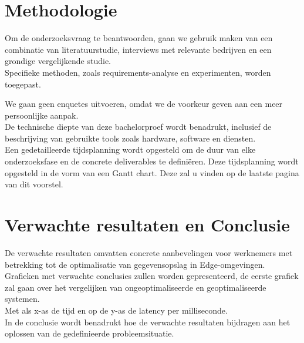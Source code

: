 \newpage


\section{Methodologie}%
\label{sec:methodologie}

Om de onderzoeksvraag te beantwoorden, gaan we gebruik maken van een combinatie van literatuurstudie,
 interviews met relevante bedrijven en een grondige vergelijkende studie. \\
 
Specifieke methoden, zoals requirements-analyse en experimenten, worden toegepast.

We gaan geen enquetes uitvoeren, omdat we de voorkeur geven aan een meer persoonlijke aanpak. \\
 
De technische diepte van deze bachelorproef wordt benadrukt,
 inclusief de beschrijving van gebruikte tools zoals hardware, software en diensten. \\

Een gedetailleerde tijdsplanning wordt opgesteld om de duur van elke onderzoeksfase en de concrete deliverables te definiëren.
Deze tijdsplanning wordt opgesteld in de vorm van een Gantt chart. Deze zal u vinden op de laatste pagina van dit voorstel.





\section{Verwachte resultaten en Conclusie}%
\label{sec:verwachte_resultaten}

De verwachte resultaten omvatten concrete aanbevelingen voor werknemers met betrekking tot de optimalisatie
van gegevensopslag in Edge-omgevingen. \\

Grafieken met verwachte conclusies zullen worden gepresenteerd,
 de eerste grafiek zal gaan over het vergelijken van ongeoptimaliseerde en geoptimaliseerde systemen. \\

Met als x-as de tijd en op de y-as de latency per milliseconde. \\

In de conclusie wordt benadrukt hoe de verwachte resultaten bijdragen aan het oplossen van de gedefinieerde probleemsituatie. \\

